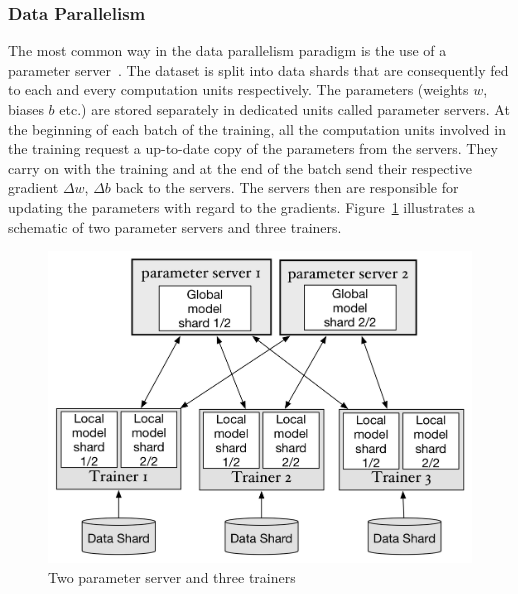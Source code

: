 \subsubsection{Data Parallelism}
The most common way in the data parallelism paradigm is the use of a parameter 
server~\cite{pserver}. The dataset is split into data shards that are 
consequently fed to each and every computation units respectively. The 
parameters (weights $w$, biases $b$ etc.) are stored separately in dedicated 
units called parameter servers. At the beginning of each batch of the training, 
all the computation units involved in the training request a up-to-date copy of 
the parameters from the servers. They carry on with the training and at the end 
of the batch send their respective gradient $\Delta w$, $\Delta b$ back to the 
servers. The servers then are responsible for updating the parameters with 
regard to the gradients. Figure~\ref{fig:pserver} illustrates a schematic of two 
parameter servers and three trainers.
\begin{figure}[H]
    \centerline{\includegraphics[scale=0.40]{background/figs/data_parallelism.png}}
    \caption{Two parameter server and three trainers}
    \label{fig:pserver}
\end{figure}

